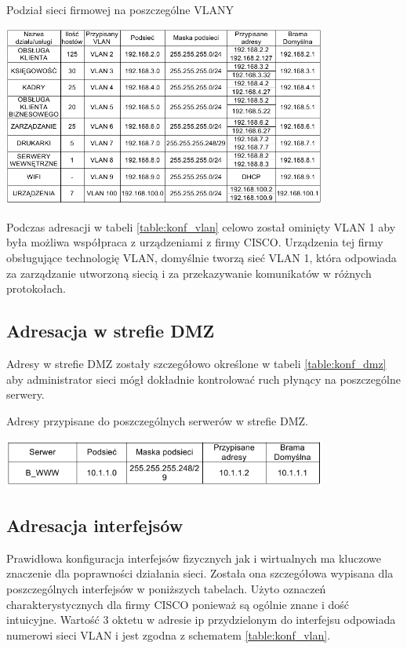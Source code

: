 \documentclass{report}
\begin{document}
\begin{table}[H]
\caption{Podział sieci firmowej na poszczególne VLANY}
\label{table:konf_vlan}
 \centering
      \includegraphics[width=0.8\textwidth]{./obrazki/ip/ip_vlan.png}
\end{table}

Podczas adresacji w tabeli \ref{table:konf_vlan} celowo został ominięty VLAN 1 aby była możliwa współpraca z urządzeniami z firmy CISCO.
Urządzenia tej firmy  obsługujące technologię VLAN, domyślnie tworzą sieć VLAN 1, która odpowiada za zarządzanie utworzoną siecią i za
 przekazywanie komunikatów w różnych protokołach.

\subsection{Adresacja w strefie DMZ}
Adresy w strefie DMZ zostały szczegółowo określone w tabeli \ref{table:konf_dmz} aby administrator sieci mógł dokładnie kontrolować ruch płynący na poszczególne serwery.
\begin{table}[H]
\caption{Adresy przypisane do poszczególnych serwerów w strefie DMZ.}
\label{table:konf_dmz}
 \centering
      \includegraphics[width=0.8\textwidth]{./obrazki/ip/ip_dmz.png}
\end{table}

\subsection{Adresacja interfejsów }
Prawidłowa konfiguracja interfejsów fizycznych jak i wirtualnych ma kluczowe znaczenie dla poprawności działania sieci. Została ona szczegółowa wypisana
dla poszczególnych interfejsów w poniższych tabelach. Użyto oznaczeń charakterystycznych dla firmy CISCO ponieważ są ogólnie znane i dość 
intuicyjne. Wartość 3 oktetu w adresie ip przydzielonym do interfejsu odpowiada numerowi sieci VLAN i jest zgodna z schematem \ref{table:konf_vlan}.
\end{document}
